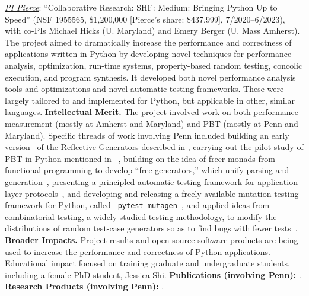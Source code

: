 {%

\emph{\underline{PI Pierce}}: ``Collaborative Research:
SHF: Medium: Bringing Python Up to Speed'' (NSF 1955565, \$1,200,000
[Pierce's share: \$437,999],
7/2020--6/2023), with co-PIs Michael Hicks (U. Maryland) and Emery Berger
(U. Mass Amherst).
The project aimed to dramatically increase the performance and
correctness of applications written in Python by developing novel
techniques for performance analysis, optimization, run-time systems,
property-based random testing, concolic execution, and program
synthesis. It developed both
novel performance analysis tools and optimizations and novel automatic
testing frameworks. These were largely tailored to and implemented for
Python, but applicable in other, similar languages.
%
{\bf Intellectual Merit.} The project involved work on both
performance measurement (mostly at Amherst and Maryland) and PBT (mostly at Penn
and Maryland).  Specific threads of work involving Penn included
building an early
version~\cite{Frohlich2023} of the Reflective Generators described in
, carrying out the pilot study of PBT in Python
mentioned in
~\cite{goldstein_problems_2022},
building on the idea of
freer monads from functional programming to develop ``free
generators,'' which unify parsing and
generation~\cite{goldstein2022parsing},
presenting a principled
automatic testing framework for application-layer
protocols~\cite{Li2021:MBToNA}, and developing and releasing a freely
available mutation testing framework for Python, called {\tt
  pytest-mutagen}~\cite{pytestmutagen}, and applied ideas from
combinatorial testing, a widely studied testing methodology, to modify
the distributions of random test-case generators so as to find bugs
with fewer tests~\cite{DBLP:conf/esop/GoldsteinHLP21}.
%
{\bf Broader Impacts.} Project results and open-source software
products are being used to increase the
performance and correctness of Python applications.
Educational impact focused on training graduate and
undergraduate students, including a female PhD student, Jessica
Shi.
%
{\bf Publications (involving Penn):} \cite{Frohlich2023,DBLP:conf/esop/GoldsteinHLP21,
  goldstein2022parsing, goldstein_problems_2022, Li2021:MBToNA}.
{\bf Research Products (involving Penn):} \cite{pytestmutagen}.

}
